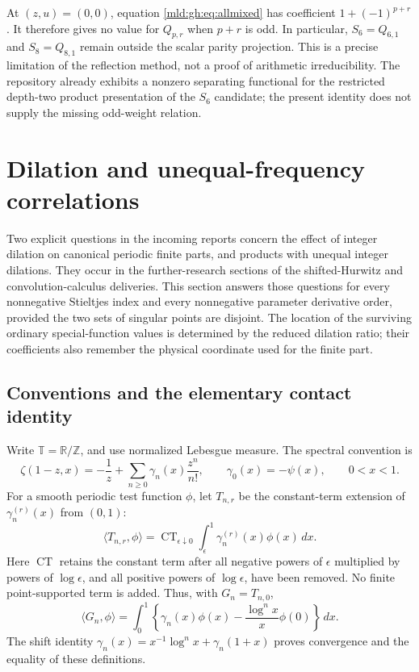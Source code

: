At $(z,u)=(0,0)$, equation \eqref{mld:gh:eq:allmixed} has coefficient
$1+(-1)^{p+r}$. It therefore gives no value for $Q_{p,r}$ when
$p+r$ is odd. In particular, $S_6=Q_{6,1}$ and $S_8=Q_{8,1}$ remain
outside the scalar parity projection. This is a precise limitation
of the reflection method, not a proof of arithmetic irreducibility.
The repository already exhibits a nonzero separating functional for
the restricted depth-two product presentation of the $S_6$ candidate;
the present identity does not supply the missing odd-weight relation.


\section{Dilation and unequal-frequency correlations}
\label{mld:dil:section}\label{mld:sec:dilation}

Two explicit questions in the incoming reports concern the effect of
integer dilation on canonical periodic finite parts, and products with
unequal integer dilations.  They occur in the further-research sections
of the shifted-Hurwitz and convolution-calculus deliveries.  This section
answers those questions for every nonnegative Stieltjes index and every
nonnegative parameter derivative order, provided the two sets of
singular points are disjoint.  The location of the surviving ordinary
special-function values is determined by the reduced dilation ratio;
their coefficients also remember the physical coordinate used for
the finite part.

\subsection{Conventions and the elementary contact identity}
Write $\mathbb T=\mathbb R/\mathbb Z$, and use normalized Lebesgue
measure.  The spectral convention is
\[
 \zeta(1-z,x)=-\frac1z+
       \sum_{n\ge0}\gamma_n(x)\frac{z^n}{n!},
 \qquad \gamma_0(x)=-\psi(x),
 \qquad 0<x<1.
\]
For a smooth periodic test function $\phi$, let $T_{n,r}$ be the
constant-term extension of $\gamma_n^{(r)}(x)$ from $(0,1)$:
\[
 \langle T_{n,r},\phi\rangle
 =\operatorname{CT}_{\epsilon\downarrow0}
      \int_\epsilon^1\gamma_n^{(r)}(x)\phi(x)\,dx.
\]
Here $\operatorname{CT}$ retains the constant term after all negative
powers of $\epsilon$ multiplied by powers of $\log\epsilon$, and all
positive powers of $\log\epsilon$, have been removed.  No finite
point-supported term is added.  Thus, with $G_n=T_{n,0}$,
\[
 \langle G_n,\phi\rangle
 =\int_0^1\left\{\gamma_n(x)\phi(x)
                  -\frac{\log^n x}{x}\phi(0)\right\}\,dx.
\]
The shift identity $\gamma_n(x)=x^{-1}\log^n x+\gamma_n(1+x)$
proves convergence and the equality of these definitions.

